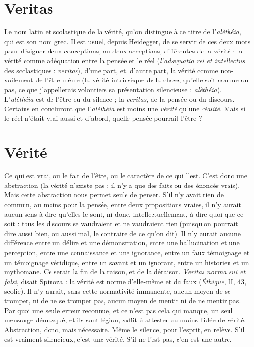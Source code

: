 \section{Veritas}
Le nom latin et scolastique de la vérité, qu’on distingue à ce titre
de l’{\it alèthéia}, qui est son nom grec. Il est usuel, depuis Heidegger,
de se servir de ces deux mots pour désigner deux conceptions, ou deux acceptions,
différentes de la vérité : la vérité comme adéquation entre la pensée et le
réel ({\it l'ad{\ae}quatio rei et intellectus} des scolastiques : {\it veritas}), d’une part, et, d’autre
part, la vérité comme non-voilement de l'être même (la vérité intrinsèque de la
chose, qu’elle soit connue ou pas, ce que j’appellerais volontiers sa présentation
silencieuse : {\it alèthéia}). L'{\it alèthéia} est de l'être ou du silence ; la {\it veritas}, de la
pensée ou du discours. Certains en concluront que l’{\it alèthéia} est moins une
{\it vérité} qu’une {\it réalité}. Mais si le réel n’était vrai aussi et d’abord, quelle pensée
pourrait l’être ?

\section{Vérité}
Ce qui est vrai, ou le fait de l’être, ou le caractère de ce qui l’est.
C’est donc une abstraction (la vérité n’existe pas : il n’y a que des
faits ou des énoncés vrais). Mais cette abstraction nous permet seule de penser.
S’il n’y avait rien de commun, au moins pour la pensée, entre deux propositions
vraies, il n’y aurait aucun sens à dire qu’elles le sont, ni donc, intellectuellement,
à dire quoi que ce soit : tous les discours se vaudraient et ne vaudraient
rien (puisqu'on pourrait dire aussi bien, ou aussi mal, le contraire de ce qu’on
dit). Il n’y aurait aucune différence entre un délire et une démonstration, entre
une hallucination et une perception, entre une connaissance et une ignorance,
entre un faux témoignage et un témoignage véridique, entre un savant et un
ignorant, entre un historien et un mythomane. Ce serait la fin de la raison, et
de la déraison. {\it Veritas norma sui et falsi}, disait Spinoza : la vérité est norme
d’elle-même et du faux ({\it Éthique}, II, 43, scolie). Il n’y aurait, sans cette normativité
immanente, aucun moyen de se tromper, ni de ne se tromper pas, aucun
moyen de mentir ni de ne mentir pas. Par quoi une seule erreur reconnue, et
ce n'est pas cela qui manque, un seul mensonge démasqué, et ils sont légion,
suffit à attester au moins l’idée de vérité. Abstraction, donc, mais nécessaire.
Même le silence, pour l'esprit, en relève. S’il est vraiment silencieux, c’est une
vérité. S’il ne l’est pas, c’en est une autre.


